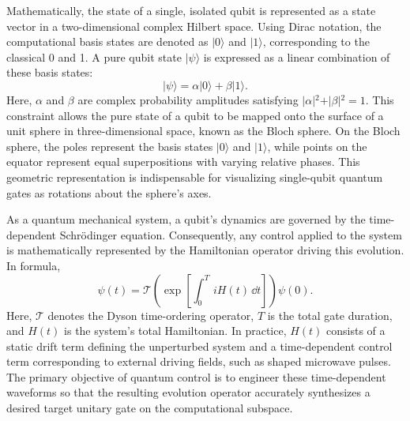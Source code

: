 Mathematically, the state of a single, isolated qubit is represented as a state vector in a two-dimensional
complex Hilbert space. Using Dirac notation, the computational basis states are denoted as $\vert{}0\rangle$ and
$\vert{}1\rangle$, corresponding to the classical 0 and 1. A pure qubit state $\vert{}\psi\rangle$ is expressed as a
linear combination of these basis states:
$$\vert{}\psi\rangle = \alpha\vert{}0\rangle + \beta\vert{}1\rangle.$$
Here,
$\alpha$ and $\beta$ are complex probability amplitudes satisfying
$\vert{}\alpha\vert{}^2 + \vert{}\beta\vert{}^2 = 1$.
This constraint allows the pure state of a qubit to be mapped onto the surface of a unit sphere in three-dimensional
space, known as the Bloch sphere. On the Bloch sphere, the poles represent the basis states $\vert{}0\rangle$ and
$\vert{}1\rangle$, while points on the equator represent equal superpositions with varying relative phases. This
geometric representation is indispensable for visualizing single-qubit quantum gates as rotations about the sphere's axes.

As a quantum mechanical system, a qubit's dynamics are governed by the time-dependent Schrödinger equation.
Consequently, any control applied to the system is mathematically represented by the Hamiltonian operator driving this
evolution. In formula, \cite{sakurai2020modern}
$$
  \psi(t) = \mathcal{T}\left(\exp\left[\int_0^T\,iH(t)\,\dd t\right]\right)\psi(0).
$$
Here, $\mathcal{T}$ denotes the Dyson time-ordering operator, $T$ is the total gate duration, and $H(t)$ is the system's
total Hamiltonian. In practice, $H(t)$ consists of a static drift term defining the unperturbed system and a
time-dependent control term corresponding to external driving fields, such as shaped microwave pulses. The primary
objective of quantum control is to engineer these time-dependent waveforms so that the resulting evolution operator
accurately synthesizes a desired target unitary gate on the computational subspace.
